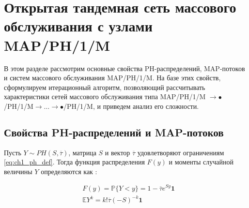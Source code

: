 

\section{Открытая тандемная сеть массового обслуживания с узлами MAP/PH/1/M}\label{sec:ch4_queues}

В этом разделе рассмотрим основные свойства PH-распределений, MAP-потоков и систем массового обслуживания MAP/PH/1/M. На базе этих свойств, сформулируем итерационный алгоритм, позволяющий рассчитывать характеристики сетей массового обслуживания типа MAP/PH/1/M $\rightarrow \bullet$/PH/1/M$\rightarrow \dots \rightarrow \bullet$/PH/1/M, и приведем анализ его сложности.


\subsection{Свойства PH-распределений и MAP-потоков}\label{sec:ch4_queues_map_ph_props}

Пусть $Y \sim PH(S, \overline{\tau})$, матрица $S$ и вектор $\overline{\tau}$ удовлетворяют ограничениям \eqref{eq:ch1_ph_def}. Тогда функция распределения $F(y)$ и моменты случайной величины $Y$ определяются как \cite{Buchholz2014}:

\begin{equation}
	\label{eq:ch4_ph_props}
	\begin{aligned}
		&F(y) = \mathbb{P}\{Y < y\} = 1 - \overline{\tau} e^{Sy} \mathbf{1}\\
		&\mathbb{E}Y^k = k! \overline{\tau} (-S)^{-k} \mathbf{1}
	\end{aligned}
\end{equation}

